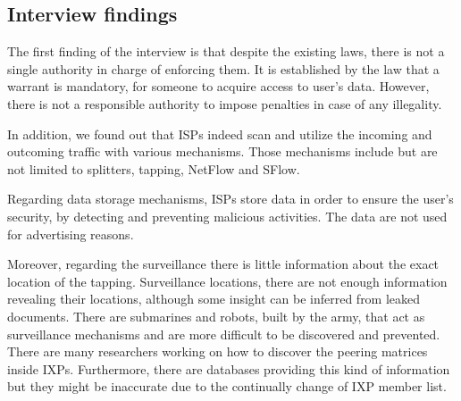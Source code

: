 \subsection{Interview findings}

The first finding of the interview is that despite the existing laws, there is 
not a single authority in charge of enforcing them. It is established by the law 
that a warrant is mandatory, for someone to acquire access to  user's data. 
However, there is not a responsible authority to impose penalties in case of any 
illegality.

In addition, we found out that ISPs indeed scan and utilize the incoming and 
outcoming traffic with various mechanisms. Those mechanisms include but are not 
limited to splitters, tapping, NetFlow and SFlow.

Regarding data storage mechanisms, ISPs store data in order to ensure the user's 
security, by detecting and preventing malicious activities. The data are not 
used for advertising reasons.

Moreover, regarding the surveillance there is little information about the exact 
location of the tapping. Surveillance locations, there are not enough 
information revealing their locations, although some insight can be inferred 
from leaked documents. There are submarines and robots, built by the army, that 
act as surveillance mechanisms and are more difficult to be discovered and 
prevented.  There are many researchers working on how to discover the peering 
matrices inside IXPs. Furthermore, there are databases providing this kind of 
information but they might be inaccurate due to the continually change of IXP 
member list.

